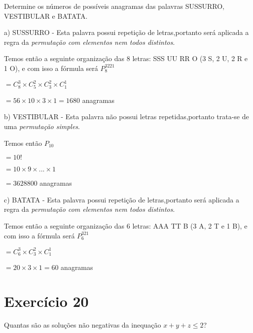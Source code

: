 \documentclass[12pt]{article}
\begin{document}
Determine os números de possíveis anagramas das palavras SUSSURRO, VESTIBULAR e BATATA.

\bigskip

a) SUSSURRO - Esta palavra possui repetição de letras,portanto será aplicada a regra da \textit{permutação com elementos nem todos distintos}.

Temos então a seguinte organização das 8 letras: SSS UU RR O (3 S, 2 U, 2 R e 1 O), e com isso a fórmula será $\displaystyle P_{8}^{3221} $

$= C_8^3 \times C_5^2 \times C_3^2 \times C_1^1$

$=56 \times 10 \times 3 \times 1 = 1680$ anagramas

\bigskip

b) VESTIBULAR - Esta palavra não possui letras repetidas,portanto trata-se de uma \textit{permutação simples}.

Temos então $P_{10}$

$= 10!$

$= 10 \times 9 \times ... \times 1$

$= 3628800$ anagramas

\bigskip

c) BATATA - Esta palavra possui repetição de letras,portanto será aplicada a regra da \textit{permutação com elementos nem todos distintos}.

Temos então a seguinte organização das 6 letras: AAA TT B (3 A, 2 T e 1 B), e com isso a fórmula será $\displaystyle P_{6}^{321} $

$= C_6^3 \times C_3^2 \times C_1^1$

$= 20 \times 3 \times 1 = 60$ anagramas

\section*{Exercício 20}

Quantas são as soluções não negativas da inequação $x + y + z \leq 2$?
\end{document}
